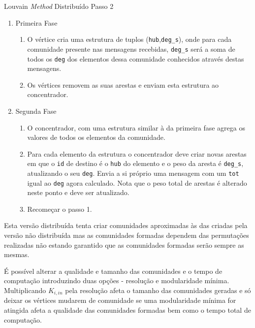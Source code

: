 \begin{algorithm}
\caption{Louvain \textit{Method} Distribuído Passo 2}
\label{alg:lmdPasso2}
\begin{enumerate}
	\item Primeira Fase
	
	\begin{enumerate}
		\item O vértice cria uma estrutura de tuplos (\verb|hub|,\verb|deg_s|), onde para cada comunidade presente nas mensagens recebidas, \verb|deg_s| será a soma de todos os \verb|deg| dos elementos dessa comunidade conhecidos através destas mensagens.
		\item Os vértices removem as suas arestas e enviam esta estrutura ao concentrador.
	\end{enumerate}
	
	\item Segunda Fase
	
	
	\begin{enumerate}
		\item O concentrador, com uma estrutura similar à da primeira fase agrega os valores de todos os elementos da comunidade.
		\item Para cada elemento da estrutura o concentrador deve criar novas arestas em que o \verb|id| de destino é o \verb|hub| do elemento e o peso da aresta é \verb|deg_s|, atualizando o seu \verb|deg|. Envia a si próprio uma mensagem com um \verb|tot| igual ao \verb|deg| agora calculado. Nota que o peso total de arestas é alterado neste ponto e deve ser atualizado.
		\item Recomeçar o passo 1.
	\end{enumerate}
\end{enumerate}
\end{algorithm}

Esta versão distribuída tenta criar comunidades aproximadas às das criadas pela versão não distribuída mas as comunidades formadas dependem das permutações realizadas não estando garantido que as comunidades formadas serão sempre as mesmas.

É possível alterar a qualidade e tamanho das comunidades e o tempo de computação introduzindo duas opções - resolução e modularidade mínima. Multiplicando $K_{i,in}$ pela resolução afeta o tamanho das comunidades geradas e só deixar os vértices mudarem de comunidade se uma modularidade mínima for atingida afeta a qualidade das comunidades formadas bem como o tempo total de computação.
\clearpage

